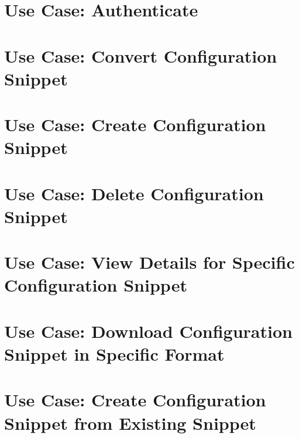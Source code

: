 \let\mypdfximage\pdfximage\def\pdfximage{\immediate\mypdfximage}\documentclass[twoside]{book}
\newcommand{\+}{\discretionary{\mbox{\scriptsize$\hookleftarrow$}}{}{}}
\begin{document}
\chapter{Use Case\+: Authenticate}
\label{doc_usecases_snippet_sharing_UC_authenticate_md}

\chapter{Use Case\+: Convert Configuration Snippet}
\label{doc_usecases_snippet_sharing_UC_convert_snippet_md}

\chapter{Use Case\+: Create Configuration Snippet}
\label{doc_usecases_snippet_sharing_UC_create_snippet_md}

\chapter{Use Case\+: Delete Configuration Snippet}
\label{doc_usecases_snippet_sharing_UC_delete_snippet_md}

\chapter{Use Case\+: View Details for Specific Configuration Snippet}
\label{doc_usecases_snippet_sharing_UC_details_snippet_md}

\chapter{Use Case\+: Download Configuration Snippet in Specific Format}
\label{doc_usecases_snippet_sharing_UC_download_snippet_md}

\chapter{Use Case\+: Create Configuration Snippet from Existing Snippet}
\label{doc_usecases_snippet_sharing_UC_duplicate_snippet_md}

\end{document}
